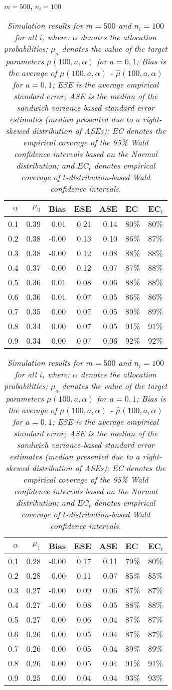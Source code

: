 \documentclass[12pt, letterpaper]{article}
\begin{document}
\begin{center}
	\textbf{$m=500$, $n_i=100$} 
\end{center}
\begin{table}[ht!]
	\centering
	\bgroup
	\def\arraystretch{1.25}
	\setlength\tabcolsep{0.05in}
	\begin{tabular}{rrrrrll}
		\hline
		$\alpha$ & $\mu_0$ & Bias & ESE & ASE & EC & EC$_t$ \\ 
		\hline
		0.1 & 0.39 & 0.01 & 0.21 & 0.14 & 80\% & 80\% \\ 
  0.2 & 0.38 & -0.00 & 0.13 & 0.10 & 86\% & 87\% \\ 
  0.3 & 0.38 & -0.00 & 0.12 & 0.08 & 88\% & 88\% \\ 
  0.4 & 0.37 & -0.00 & 0.12 & 0.07 & 87\% & 88\% \\ 
  0.5 & 0.36 & 0.01 & 0.08 & 0.06 & 88\% & 88\% \\ 
  0.6 & 0.36 & 0.01 & 0.07 & 0.05 & 86\% & 86\% \\ 
  0.7 & 0.35 & 0.00 & 0.07 & 0.05 & 89\% & 89\% \\ 
  0.8 & 0.34 & 0.00 & 0.07 & 0.05 & 91\% & 91\% \\ 
  0.9 & 0.34 & 0.00 & 0.07 & 0.06 & 92\% & 92\% \\ 
		\hline
	\end{tabular}
	\egroup
	\quad 
	\bgroup
	\setlength\tabcolsep{0.05in}
	\def\arraystretch{1.25}
	\begin{tabular}{rrrrrll}
		\hline
		$\alpha$ & $\mu_1$ & Bias & ESE & ASE & EC & EC$_t$ \\
		\hline
		0.1 & 0.28 & -0.00 & 0.17 & 0.11 & 79\% & 80\% \\ 
  0.2 & 0.28 & -0.00 & 0.11 & 0.07 & 85\% & 85\% \\ 
  0.3 & 0.27 & -0.00 & 0.09 & 0.06 & 87\% & 87\% \\ 
  0.4 & 0.27 & -0.00 & 0.08 & 0.05 & 88\% & 88\% \\ 
  0.5 & 0.27 & 0.00 & 0.06 & 0.04 & 87\% & 87\% \\ 
  0.6 & 0.26 & 0.00 & 0.05 & 0.04 & 87\% & 87\% \\ 
  0.7 & 0.26 & 0.00 & 0.05 & 0.04 & 89\% & 89\% \\ 
  0.8 & 0.26 & 0.00 & 0.05 & 0.04 & 91\% & 91\% \\ 
  0.9 & 0.25 & 0.00 & 0.04 & 0.04 & 93\% & 93\% \\ 
		\hline
	\end{tabular}
	\egroup
	\caption*{\textit{Simulation results for $m = 500$ and $n_i = 100$ for all $i$, where: $\alpha$ denotes the allocation probabilities; $\mu_a$ denotes the value of the target parameters $\mu(100, a, \alpha)$ for $a=0,1$; Bias is the average of $\mu(100, a, \alpha)$ - $\hat{\mu}(100, a, \alpha)$ for $a=0, 1$; ESE is the average empirical standard error; ASE is the median of the sandwich variance-based standard error estimates (median presented due to a right-skewed distribution of ASEs); EC denotes the empirical coverage of the 95\% Wald confidence intervals based on the Normal distribution; and $EC_t$ denotes empirical coverage of $t$-distribution-based Wald confidence intervals.}}
\end{table}
\end{document}
